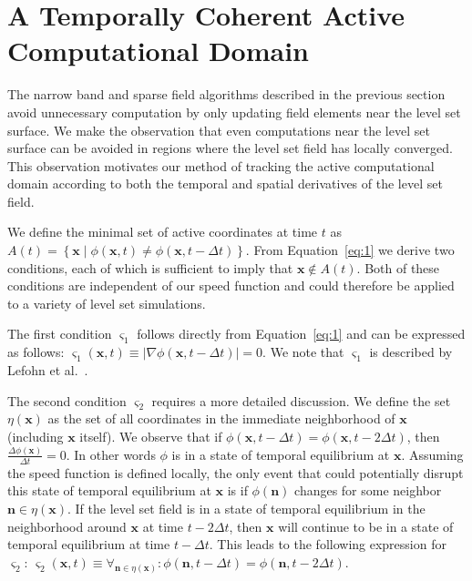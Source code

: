 \documentclass{egpubl}
\newcommand{\leftbracket}{\left(}
\newcommand{\rightbracket}{\right)}
\newcommand{\leftcbracket}{\left\{}
\newcommand{\rightcbracket}{\right\}}
\newcommand{\leftvbracket}{\left|}
\newcommand{\rightvbracket}{\right|}
\newcommand{\boldx}{{\mathbf x}}
\newcommand{\boldn}{{\mathbf n}}
\newcommand{\phixt}{ \mathit{\phi} \leftbracket \boldx , t \rightbracket }
\newcommand{\phixtmdt}{ \mathit{\phi} \leftbracket \boldx , t - \Delta t \rightbracket }
\newcommand{\phixtmtdt}{ \mathit{\phi} \leftbracket \boldx , t - 2 \Delta t \rightbracket }
\newcommand{\conditionone}{ { \varsigma }_{1} \leftbracket \boldx , t \rightbracket }
\newcommand{\conditiontwo}{ { \varsigma }_{2} \leftbracket \boldx , t \rightbracket }
\newcommand{\nx}{ \eta \leftbracket \boldx \rightbracket }
\begin{document}
\section{A Temporally Coherent Active Computational Domain}
\label{sec:aTemporallyCoherentActiveComputationalDomain}

The narrow band and sparse field algorithms described in the previous section avoid unnecessary computation by only updating field elements near the level set surface. We make the observation that even computations near the level set surface can be avoided in regions where the level set field has locally converged. This observation motivates our method of tracking the active computational domain according to both the temporal and spatial derivatives of the level set field.

We define the minimal set of active coordinates at time $t$ as $A \leftbracket t \rightbracket = \leftcbracket \boldx \mid \phixt \ne \phixtmdt \rightcbracket $. From Equation~\ref{eq:1} we derive two conditions, each of which is sufficient to imply that $ \boldx  \notin A \leftbracket t \rightbracket $. Both of these conditions are independent of our speed function and could therefore be applied to a variety of level set simulations.

The first condition ${ \varsigma }_{1}$ follows directly from Equation~\ref{eq:1} and can be expressed as follows: $ \conditionone \equiv \leftvbracket \nabla \phixtmdt \rightvbracket = 0 $. We note that ${ \varsigma }_{1}$ is described by Lefohn et al.~\cite{Lefohn-2003-Vis,Lefohn-2004}.

The second condition ${ \varsigma }_{2}$ requires a more detailed discussion. We define the set $ \nx $ as the set of all coordinates in the immediate neighborhood of $ \boldx $ (including $  \boldx $ itself). We observe that if $ \phixtmdt = \phixtmtdt $, then $ \frac{ \Delta \phi \leftbracket \boldx \rightbracket }{ \Delta t } = 0 $. In other words $ \phi $ is in a state of temporal equilibrium at $ \boldx $. Assuming the speed function is defined locally, the only event that could potentially disrupt this state of temporal equilibrium at $ \boldx $ is if $ \phi \leftbracket \boldn \rightbracket $ changes for some neighbor $ \boldn \in \nx $. If the level set field is in a state of temporal equilibrium in the neighborhood around $ \boldx $ at time $ t - 2 \Delta t $, then $ \boldx $ will continue to be in a state of temporal equilibrium at time $ t - \Delta t $. This leads to the following expression for ${ \varsigma }_{2}$: $ \conditiontwo \equiv { \forall }_{ \boldn \in \nx } : \phi \leftbracket \boldn , t - \Delta t \rightbracket = \phi \leftbracket \boldn , t - 2 \Delta t \rightbracket $.
\end{document}
